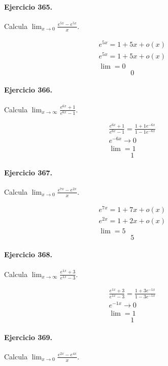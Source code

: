 \documentclass[11pt,a4paper]{article}
\begin{document}
\paragraph{Ejercicio 365.} Calcula $\displaystyle\lim_{x\to0}\frac{e^{5x}-e^{5x}}{x}$.

\[
\begin{aligned}
e^{5x}=1+5x+o(x)\\
e^{5x}=1+5x+o(x)\\
\lim=0
\end{aligned}
\]
\[\boxed{0}\]


\paragraph{Ejercicio 366.} Calcula $\displaystyle\lim_{x\to\infty}\frac{e^{6x}+1}{e^{6x}-1}$.

\[
\begin{aligned}
\frac{e^{6x}+1}{e^{6x}-1}=\frac{1+1e^{-6x}}{1-1e^{-6x}}\\
e^{-6x}\to0\\
\lim=1
\end{aligned}
\]
\[\boxed{1}\]


\paragraph{Ejercicio 367.} Calcula $\displaystyle\lim_{x\to0}\frac{e^{7x}-e^{2x}}{x}$.

\[
\begin{aligned}
e^{7x}=1+7x+o(x)\\
e^{2x}=1+2x+o(x)\\
\lim=5
\end{aligned}
\]
\[\boxed{5}\]


\paragraph{Ejercicio 368.} Calcula $\displaystyle\lim_{x\to\infty}\frac{e^{1x}+3}{e^{1x}-3}$.

\[
\begin{aligned}
\frac{e^{1x}+3}{e^{1x}-3}=\frac{1+3e^{-1x}}{1-3e^{-1x}}\\
e^{-1x}\to0\\
\lim=1
\end{aligned}
\]
\[\boxed{1}\]


\paragraph{Ejercicio 369.} Calcula $\displaystyle\lim_{x\to0}\frac{e^{2x}-e^{4x}}{x}$.
\end{document}

